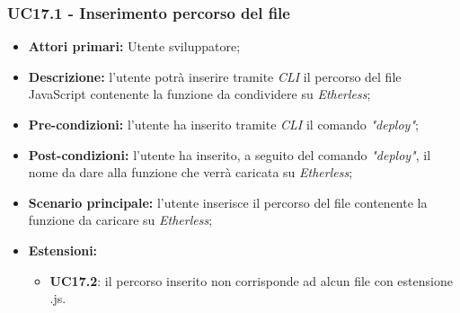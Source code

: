 \subsubsection{UC17.1 - Inserimento percorso del file}
\begin{itemize}
	\item \textbf{Attori primari:} Utente sviluppatore;
	\item \textbf{Descrizione:} l'utente potrà inserire tramite \textit{CLI\glo} il percorso del file JavaScript contenente la funzione da condividere su \textit{Etherless}; 
	\item \textbf{Pre-condizioni:} l'utente ha inserito tramite \textit{CLI\glo} il comando \textit{"deploy\glos"};
	\item \textbf{Post-condizioni:} l'utente ha inserito, a seguito del comando \textit{"deploy\glos"}, il nome da dare alla funzione che verrà caricata su \textit{Etherless};
	\item \textbf{Scenario principale:} l'utente inserisce il percorso del file contenente la funzione da caricare su \textit{Etherless};
	\item \textbf{Estensioni:} 
	\begin{itemize}
		\item \textbf{UC17.2}: il percorso inserito non corrisponde ad alcun file con estensione .js.
	\end{itemize}
\end{itemize}